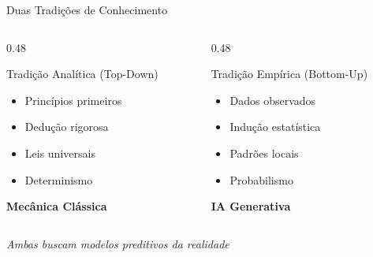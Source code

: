 \documentclass[aspectratio=169,12pt]{beamer}
\begin{document}
\begin{frame}{Duas Tradições de Conhecimento}
    \begin{columns}[T]
        \begin{column}{0.48\textwidth}
            \begin{block}{Tradição Analítica (Top-Down)}
                \begin{itemize}
                    \item Princípios primeiros
                    \item Dedução rigorosa
                    \item Leis universais
                    \item Determinismo
                \end{itemize}
                \vspace{0.3cm}
                \centering
                \textbf{Mecânica Clássica}
            \end{block}
        \end{column}
        \begin{column}{0.48\textwidth}
            \begin{block}{Tradição Empírica (Bottom-Up)}
                \begin{itemize}
                    \item Dados observados
                    \item Indução estatística
                    \item Padrões locais
                    \item Probabilismo
                \end{itemize}
                \vspace{0.3cm}
                \centering
                \textbf{IA Generativa}
            \end{block}
        \end{column}
    \end{columns}
    \vspace{0.5cm}
    \begin{center}
        \textit{Ambas buscam modelos preditivos da realidade}
    \end{center}
\end{frame}
\end{document}
